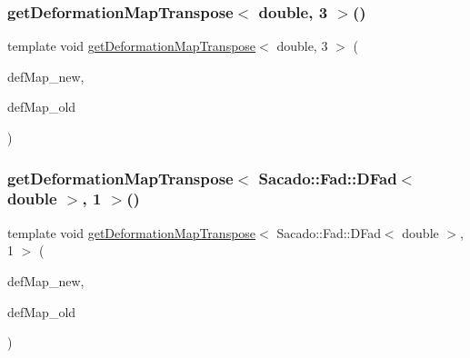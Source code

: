 \subsubsection{\texorpdfstring{getDeformationMapTranspose$<$ double, 3 $>$()}{getDeformationMapTranspose< double, 3 >()}}
{\footnotesize\ttfamily template void \mbox{\hyperlink{group___evaluation_functions_gad4003712a2346a79e13bdbfcad4d1e1c}{get\+Deformation\+Map\+Transpose}}$<$ double, 3 $>$ (\begin{DoxyParamCaption}\item[{\mbox{\hyperlink{structdeformation_map}{deformation\+Map}}$<$ double, 3 $>$ \&}]{def\+Map\+\_\+new,  }\item[{\mbox{\hyperlink{structdeformation_map}{deformation\+Map}}$<$ double, 3 $>$ \&}]{def\+Map\+\_\+old }\end{DoxyParamCaption})}

\mbox{\label{function_evaluations_8cc_a57b94bf3e5309492433be576f3e57c03}} 
\subsubsection{\texorpdfstring{getDeformationMapTranspose$<$ Sacado::Fad::DFad$<$ double $>$, 1 $>$()}{getDeformationMapTranspose< Sacado::Fad::DFad< double >, 1 >()}}
{\footnotesize\ttfamily template void \mbox{\hyperlink{group___evaluation_functions_gad4003712a2346a79e13bdbfcad4d1e1c}{get\+Deformation\+Map\+Transpose}}$<$ Sacado\+::\+Fad\+::\+D\+Fad$<$ double $>$, 1 $>$ (\begin{DoxyParamCaption}\item[{\mbox{\hyperlink{structdeformation_map}{deformation\+Map}}$<$ Sacado\+::\+Fad\+::\+D\+Fad$<$ double $>$, 1 $>$ \&}]{def\+Map\+\_\+new,  }\item[{\mbox{\hyperlink{structdeformation_map}{deformation\+Map}}$<$ Sacado\+::\+Fad\+::\+D\+Fad$<$ double $>$, 1 $>$ \&}]{def\+Map\+\_\+old }\end{DoxyParamCaption})}

\mbox{\label{function_evaluations_8cc_a4ddf5fdc58a19c93899099e38e4a2125}} 
